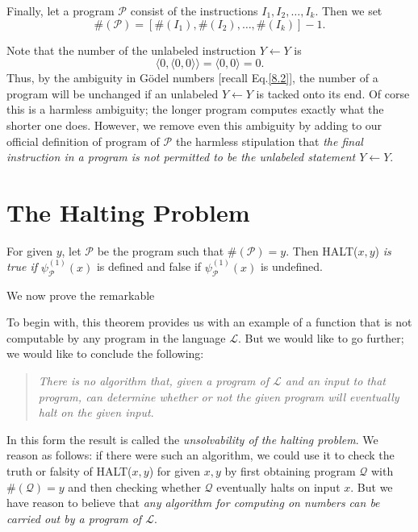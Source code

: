 \documentclass[12pt,a4paper,twoside,openany]{book}
\begin{document}
Finally, let a program $\mathscr{P}$ consist of the instructions $I_1,I_2,\ldots,I_k$. Then we set
\begin{equation}
    \#(\mathscr{P})=[\#(I_1),\#(I_2),\ldots,\#(I_k)]-1.
    \label{4.1.1}
\end{equation}

Note that the number of the unlabeled instruction $Y\leftarrow Y$ is $$\langle 0,\langle 0,0\rangle\rangle=\langle 0,0\rangle=0.$$ Thus, by the ambiguity in G\"odel numbers [recall Eq.\;\ref{8.2}], the number of a program will be unchanged if an unlabeled $Y\leftarrow Y$ is tacked onto its end. Of corse this is a harmless ambiguity; the longer program computes exactly what the shorter one does. However, we remove even this ambiguity by adding to our official definition of program of $\mathscr{P}$ the harmless stipulation that \textit{the final instruction in a program is not permitted to be the unlabeled statement $Y\leftarrow Y$}.

\section{The Halting Problem}

For given $y$, let $\mathscr{P}$ be the program such that $\#(\mathscr{P})=y$. Then HALT($x,y$) \textit{is true if} $\psi_{\mathscr{P}}^{(1)}(x)$ is defined and false if $\psi_{\mathscr{P}}^{(1)}(x)$ is undefined.

We now prove the remarkable

To begin with, this theorem provides us with an example of a function that is not computable by any program in the language $\mathscr{L}$. But we would like to go further; we would like to conclude the following:
\begin{quote}
    \textit{There is no algorithm that, given a program of $\mathscr{L}$ and an input to that program, can determine whether or not the given program will eventually halt on the given input}.
\end{quote}
In this form the result is called the \textit{unsolvability of the halting problem}. We reason as follows: if there were such an algorithm, we could use it to check the truth or falsity of HALT($x,y$) for given $x,y$ by first obtaining program $\mathscr{Q}$ with $\#(\mathscr{Q})=y$ and then checking whether $\mathscr{Q}$ eventually halts on input $x$. But we have reason to believe that \textit{any algorithm for computing on numbers can be carried out by a program of $\mathscr{L}$}.
\end{document}
